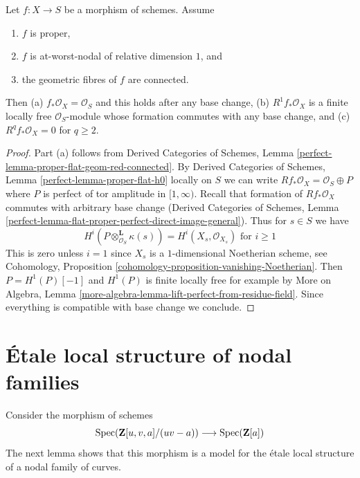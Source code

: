 \begin{lemma}
\label{lemma-genus-in-nodal-family-of-curves}
Let $f : X \to S$ be a morphism of schemes. Assume
\begin{enumerate}
\item $f$ is proper,
\item $f$ is at-worst-nodal of relative dimension $1$, and
\item the geometric fibres of $f$ are connected.
\end{enumerate}
Then (a) $f_*\mathcal{O}_X = \mathcal{O}_S$ and this holds after
any base change, (b) $R^1f_*\mathcal{O}_X$ is a finite locally free
$\mathcal{O}_S$-module whose formation commutes with any base change,
and (c) $R^qf_*\mathcal{O}_X = 0$ for $q \geq 2$.
\end{lemma}

\begin{proof}
Part (a) follows from
Derived Categories of Schemes, Lemma
\ref{perfect-lemma-proper-flat-geom-red-connected}.
By Derived Categories of Schemes, Lemma
\ref{perfect-lemma-proper-flat-h0} locally on $S$
we can write $Rf_*\mathcal{O}_X = \mathcal{O}_S \oplus P$
where $P$ is perfect of tor amplitude in $[1, \infty)$.
Recall that formation of $Rf_*\mathcal{O}_X$ commutes
with arbitrary base change
(Derived Categories of Schemes, Lemma
\ref{perfect-lemma-flat-proper-perfect-direct-image-general}).
Thus for $s \in S$ we have
$$
H^i(P \otimes_{\mathcal{O}_S}^\mathbf{L} \kappa(s)) =
H^i(X_s, \mathcal{O}_{X_s})
\text{ for }i \geq 1
$$
This is zero unless $i = 1$ since $X_s$ is a $1$-dimensional
Noetherian scheme, see
Cohomology, Proposition \ref{cohomology-proposition-vanishing-Noetherian}.
Then $P = H^1(P)[-1]$ and $H^1(P)$ is finite locally free
for example by More on Algebra, Lemma
\ref{more-algebra-lemma-lift-perfect-from-residue-field}.
Since everything is compatible with base change we conclude.
\end{proof}





\section{\'Etale local structure of nodal families}
\label{section-etale-local-nodal}


\noindent
Consider the morphism of schemes
$$
\mathop{\mathrm{Spec}}(\mathbf{Z}[u, v, a]/(uv - a))
\longrightarrow
\mathop{\mathrm{Spec}}(\mathbf{Z}[a])
$$
The next lemma shows that this morphism is a model for
the \'etale local structure of a nodal family of curves.

